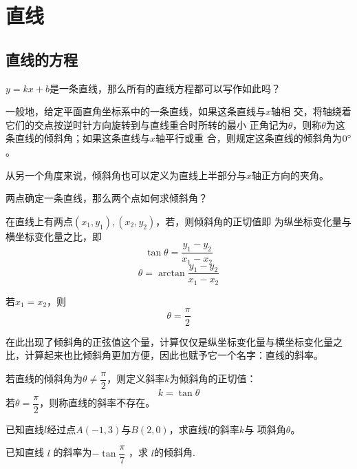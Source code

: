 \section{直线}
\subsection{直线的方程}
\(y=kx+b\)是一条直线，那么所有的直线方程都可以写作如此吗？
\begin{definition}[直线的倾斜角]
    一般地，给定平面直角坐标系中的一条直线，如果这条直线与\(x\)轴相
    交，将轴绕着它们的交点按逆时针方向旋转到与直线重合时所转的最小
    正角记为\(\theta\)，则称\(\theta\)为这条直线的倾斜角；如果这条直线与\(x\)轴平行或重
    合，则规定这条直线的倾斜角为\(0^\circ\)。

    从另一个角度来说，倾斜角也可以定义为直线上半部分与\(x\)轴正方向的夹角。
\end{definition}
两点确定一条直线，那么两个点如何求倾斜角？

\begin{theorem}
    在直线上有两点\((x_1,y_1),(x_2,y_2)\)，若\(\)，则倾斜角的正切值即
    为纵坐标变化量与横坐标变化量之比，即
    \begin{equation}
        \tan\theta=\frac{y_1-y_2}{x_1-x_2}
    \end{equation}
    \begin{equation}
        \theta=\arctan\frac{y_1-y_2}{x_1-x_2}
    \end{equation}

    若\(x_1= x_2\)，则\begin{equation}
        \theta=\dfrac{\pi}{2}
    \end{equation}
\end{theorem}
在此出现了倾斜角的正弦值这个量，计算仅仅是纵坐标变化量与横坐标变化量之比，计算起来也比倾斜角更加方便，因此也赋予它一个名字：直线的斜率。
\begin{definition}[直线的斜率]若直线的倾斜角为\(\theta\neq\dfrac{\pi}{2}\)，则定义斜率\(k\)为倾斜角的正切值：
   \begin{equation}
     k=\tan\theta
   \end{equation}
   若\(\theta=\dfrac{\pi}{2}\)，则称直线的斜率不存在。
\end{definition}

\begin{example}
    已知直线\(l\)经过点$A(-1,3)$与$B(2,0)$，求直线\(l\)的斜率$k$与
    项斜角\(\theta\)。
\end{example}
\begin{jie}
    
\end{jie}
\begin{exercise}
  已知直线  $l $ 的斜率为$-\tan \dfrac{\pi}{7} $ ，求 $l $的倾斜角. 
\end{exercise}


